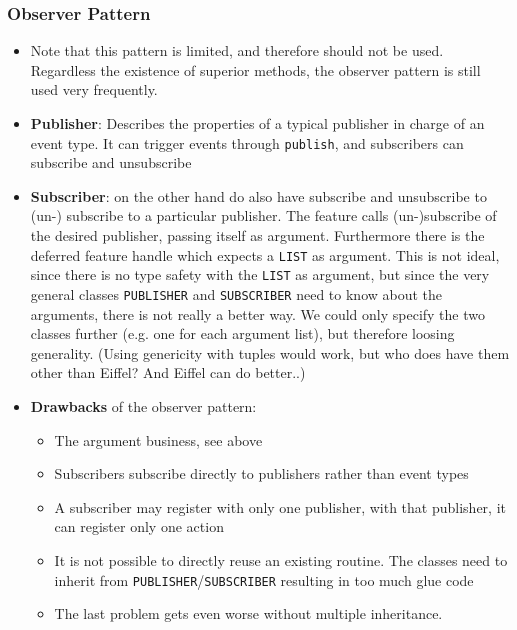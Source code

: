 \documentclass[a4paper]{article}
\newcommand{\inline}[1]{\lstinline!#1!}%
\begin{document}
\subsubsection{Observer Pattern}
\begin{itemize}
\item Note that this pattern is limited, and therefore should not be used. Regardless the existence of superior methods, the observer pattern is still used very frequently.
\item \textbf{Publisher}: Describes the properties of a typical publisher in charge of an event type. It can trigger events through \inline{publish}, and subscribers can subscribe and unsubscribe
\item \textbf{Subscriber}:  on the other hand do also have subscribe and unsubscribe to (un-) subscribe to a 
particular publisher. The feature calls (un-)subscribe of the desired publisher, passing itself as 
argument. Furthermore there is the deferred feature handle which expects a \inline{LIST} as 
argument. This is not ideal, since there is no type safety with the \inline{LIST} as argument, but since 
the very general classes \inline{PUBLISHER} and \inline{SUBSCRIBER} need to know about the arguments, there is not really a better way. We could only specify the two classes further (e.g. one for 
each argument list), but therefore loosing generality. (Using genericity with tuples would 
work, but who does have them other than Eiffel? And Eiffel can do better..)
\item \textbf{Drawbacks} of the observer pattern:
\begin{itemize}
\item The argument business, see above
\item Subscribers subscribe directly to publishers rather than event types
\item A subscriber may register with only one publisher, with that publisher, it can register only one action
\item It is not possible to directly reuse an existing routine. The classes need to inherit from \inline{PUBLISHER}/\inline{SUBSCRIBER} resulting in too much glue code
\item The last problem gets even worse without multiple inheritance. 
\end{itemize}
\end{itemize}
\end{document}
